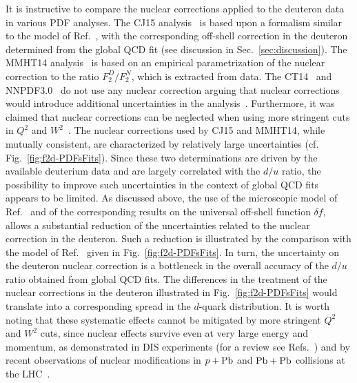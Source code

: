\documentclass[%
      aps,
      prd,
      floatfix,
      preprintnumbers,
      preprint,
      showpacs,
      nofootinbib,
      tightenlines,
      amssymb,
      amsmath
]{revtex4-1}
\begin{document}
It is instructive to compare the nuclear corrections applied to the deuteron data in various PDF analyses. 
The CJ15 analysis~\cite{Accardi:2016qay} is based upon a formalism similar to 
the model of Ref.~\cite{KP04}, with the corresponding off-shell correction 
in the deuteron determined from the global QCD fit (see discussion in Sec.~\ref{sec:discussion}).  
The MMHT14 analysis~\cite{Harland-Lang:2014zoa} is based on an empirical parametrization 
of the nuclear correction to the ratio $F_2^D/F_2^N$, which is extracted from data. 
The CT14~\cite{Dulat:2015mca} and NNPDF3.0~\cite{Ball:2014uwa} do not use any nuclear 
correction arguing that nuclear corrections would introduce additional  
uncertainties in the analysis~\cite{Ball:2014uwa}. Furthermore, it was claimed that 
nuclear corrections can be neglected 
when using more stringent cuts in $Q^2$ and $W^2$~\cite{Dulat:2015mca}. 
The nuclear corrections used by CJ15 and
MMHT14, while mutually consistent, are characterized by relatively large uncertainties 
(cf. Fig.~\ref{fig:f2d-PDFsFits}). 
Since these two determinations are driven by the available deuterium data and are 
largely correlated with the $d/u$ ratio, the possibility to improve such uncertainties 
in the context of global QCD fits appears to be limited. 
As discussed above, the use of the microscopic model of Ref.~\cite{KP04} 
and of the corresponding results on the universal off-shell function $\delta f$, allows 
a substantial reduction of the uncertainties related to the nuclear correction in the deuteron. 
Such a reduction is illustrated by the comparison with the model
of Ref.~\cite{KP04} given in Fig.~\ref{fig:f2d-PDFsFits}. 
In turn, the uncertainty on the deuteron nuclear correction is a bottleneck in the 
overall accuracy of the $d/u$ ratio obtained from global QCD fits.  
The differences in the treatment of the nuclear corrections in the deuteron 
illustrated in Fig.~\ref{fig:f2d-PDFsFits} would translate into a corresponding spread   
in the $d$-quark distribution. 
It is worth noting that these systematic effects cannot be mitigated by more stringent 
$Q^2$ and $W^2$ cuts, since nuclear effects survive even 
at very large energy and momentum, as demonstrated in DIS experiments 
(for a review see Refs.~\cite{Arneodo:1992wf,Norton:2003cb})  
and by recent observations of nuclear modifications in 
$p+{\rm Pb}$ and ${\rm Pb}+{\rm Pb}$ collisions at the 
LHC~\cite{Khachatryan:2015hha,Khachatryan:2015pzs,Aad:2015gta,Aaij:2014pvu,Senosi:2015omk,Aad:2012ew,Chatrchyan:2014csa}.  
\end{document}
